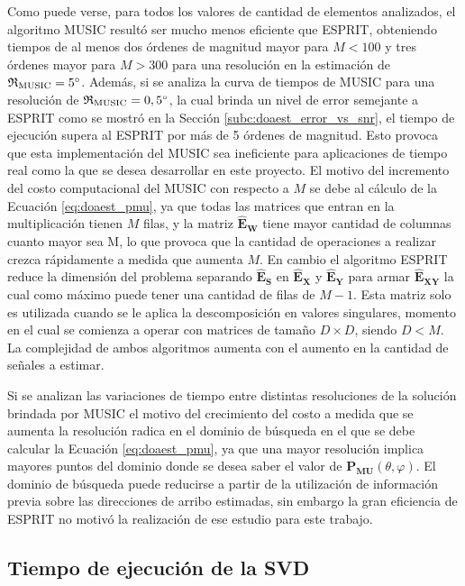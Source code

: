 Como puede verse, para todos los valores de cantidad de elementos analizados, el algoritmo MUSIC resultó ser mucho menos eficiente que ESPRIT, obteniendo tiempos de al menos dos órdenes de magnitud mayor para $M<100$ y tres órdenes mayor para $M>300$ para una resolución en la estimación de $\mathfrak{R_{\textrm{MUSIC}}}=5^{\circ}$. Además, si se analiza la curva de tiempos de MUSIC para una resolución de $\mathfrak{R_{\textrm{MUSIC}}}=0,5^{\circ}$, la cual brinda un nivel de error semejante a ESPRIT como se mostró en la Sección \ref{subc:doaest_error_vs_snr}, el tiempo de ejecución supera al ESPRIT por más de 5 órdenes de magnitud. Esto provoca que esta implementación del MUSIC sea ineficiente para aplicaciones de tiempo real como la que se desea desarrollar en este proyecto. El motivo del incremento del costo computacional del MUSIC con respecto a $M$ se debe al cálculo de la Ecuación \ref{eq:doaest_pmu}, ya que todas las matrices que entran en la multiplicación tienen $M$ filas, y la matriz $\mathbf{\hat{E}_W}$ tiene mayor cantidad de columnas cuanto mayor sea M, lo que provoca que la cantidad de operaciones a realizar crezca rápidamente a medida que aumenta $M$. En cambio el algoritmo ESPRIT reduce la dimensión del problema separando  $\mathbf{\hat{E}_S}$ en  $\mathbf{\hat{E}_X}$ y  $\mathbf{\hat{E}_Y}$ para armar  $\mathbf{\hat{E}_{XY}}$ la cual como máximo puede tener una cantidad de filas de $M-1$. Esta matriz solo es utilizada cuando se le aplica la descomposición en valores singulares, momento en el cual se comienza a operar con matrices de tamaño $D\times D$, siendo $D<M$. La complejidad de ambos algoritmos aumenta con el aumento en la cantidad de señales a estimar.

Si se analizan las variaciones de tiempo entre distintas resoluciones de la solución brindada por MUSIC el motivo del crecimiento del costo a medida que se aumenta la resolución radica en el dominio de búsqueda en el que se debe calcular la Ecuación \ref{eq:doaest_pmu}, ya que una mayor resolución implica mayores puntos del dominio donde se desea saber el valor de $\mathbf{P_{MU}}(\theta,\varphi)$. El dominio de búsqueda puede reducirse a partir de la utilización de información previa sobre las direcciones de arribo estimadas, sin embargo la gran eficiencia de ESPRIT no motivó la realización de ese estudio para este trabajo.

\subsection{Tiempo de ejecución de la SVD}


